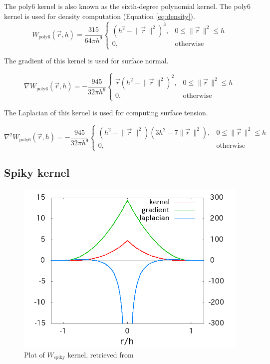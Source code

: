 \documentclass[a4paper, 12pt, oneside]{book}
\begin{document}
\begin{doublespace}
The poly6 kernel is also known as the sixth-degree polynomial kernel. The poly6 kernel is used for density computation (Equation \ref{eq:density}).
    \begin{equation}
        W_{\mathrm{poly6}} (\vec{r}, h) = \frac{315} {64 \pi h^{9}}
        \begin{cases}
            (h^{2} - \lVert\vec{r}\,\rVert^{2})^{3}, & 0 \leq \lVert\vec{r}\,\rVert^2 \leq h \\
            0, & \mathrm{otherwise}
        \end{cases}
    \end{equation}
    
    The gradient of this kernel is used for surface normal.
    
    \begin{equation}
        \nabla W_{\mathrm{poly6}} (\vec{r}, h) = -\frac{945}{32 \pi h^9}
        \begin{cases}
            \vec{r}(h^2 - \lVert\vec{r}\,\rVert^2)^2, & 0 \leq \lVert\vec{r}\,\rVert^2 \leq h \\
            0, & \mathrm{otherwise}
        \end{cases}
    \end{equation}
    
    The Laplacian of this kernel is used for computing surface tension.
    
    \begin{equation}
        \nabla^2 W_{\mathrm{poly6}} (\vec{r}, h) = -\frac{945}{32 \pi h^9}
        \begin{cases}
            (h^2 - \lVert\vec{r}\,\rVert^2)(3h^2 - 7\lVert\vec{r}\,\rVert^2), & 0 \leq \lVert\vec{r}\,\rVert^2 \leq h \\
            0, & \mathrm{otherwise}
        \end{cases}
    \end{equation}
    
\end{doublespace}

\subsection{Spiky kernel}

\begin{figure}[H]
    \centering
    \includegraphics[width=0.6\linewidth]{images/kernel_spiky.png}
    \caption{Plot of \(W_{\mathrm{spiky}}\) kernel, retrieved from \cite{web:pukiwiki_kernel_functions}} 
\end{figure}
\end{document}
